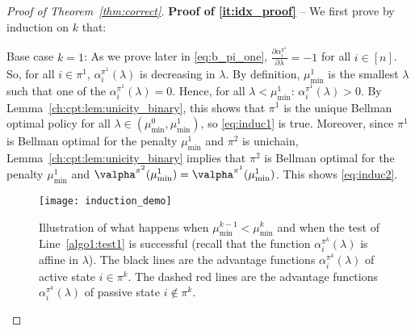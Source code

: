 \begin{proof}[Proof of Theorem~\ref{thm:correct}]
    \textbf{Proof of \ref{it:idx_proof}} -- We first prove by induction on $k$ that:\\

    Base case $k=1$: As we prove later in \eqref{eq:b_pi_one}, $\frac{\partial \alpha^{\pi^1}_i}{\partial \lambda} =-1$ for all $i\in[n]$.
    So, for all $i\in\pi^1$, $\alpha^{\pi^1}_i(\lambda)$ is decreasing in $\lambda$.
    By definition, $\mu^1_{\min}$ is the smallest $\lambda$ such that one of the $\alpha^{\pi^{1}}_i(\lambda) = 0$.
    Hence, for all $\lambda<\mu^1_{\min}$: $\alpha^{\pi^{1}}_i(\lambda)>0$.
    By Lemma~\ref{ch:cpt:lem:unicity_binary}, this shows that $\pi^1$ is the unique Bellman optimal policy for all $\lambda\in (\mu^0_{\min}, \mu^1_{\min})$, so \ref{eq:induc1} is true.
    Moreover, since $\pi^1$ is Bellman optimal for the penalty $\mu^1_{\min}$ and $\pi^2$ is unichain, Lemma~\ref{ch:cpt:lem:unicity_binary} implies that $\pi^{2}$ is Bellman optimal for the penalty $\mu^{1}_{\min}$ and $\valpha^{\pi^2}(\mu^1_{\min}) =\valpha^{\pi^1}(\mu^1_{\min})$.
    This shows \ref{eq:induc2}.
    \begin{figure}[ht]
        \centering
            \texttt{[image: induction\_demo]}
        \caption{Illustration of what happens when $\mu^{k-1}_{\min}<\mu^k_{\min}$ and when the test of Line~\ref{algo1:test1} is successful (recall that the function $\alpha^{\pi^{k}}_i(\lambda)$ is affine in $\lambda$). The black lines are the advantage functions $\alpha^{\pi^k}_i(\lambda)$ of active state $i\in\pi^k$. The dashed red lines are the advantage functions $\alpha^{\pi^k}_i(\lambda)$ of passive state $i\not\in\pi^k$.}
        \label{fig:proof_algo}
    \end{figure}


\end{proof}
